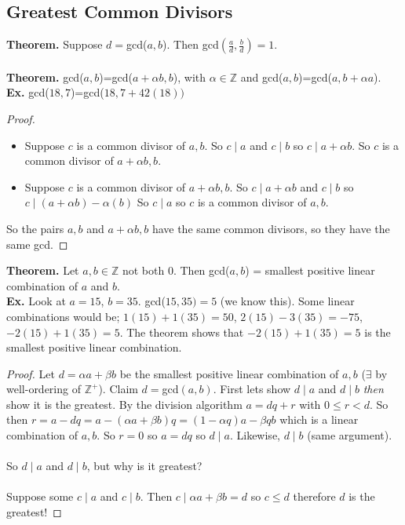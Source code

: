 \documentclass[class=article, crop=false]{standalone}
\def\integers{{\mathbb Z}}
\begin{document}
\subsection{Greatest Common Divisors}
\textbf{Theorem.} Suppose $d=$gcd($a,b$). Then gcd$\left(\frac{a}{d}, \frac{b}{d}\right)=1$.\\\\
\textbf{Theorem.} gcd($a,b$)=gcd($a+\alpha b,b$), with $\alpha\in\integers$ and gcd($a,b$)=gcd($a, b+\alpha a$).\\
\textbf{Ex.} gcd($18,7$)=gcd($18, 7+42(18))$
\begin{proof}
	$ $
	\begin{itemize}
		\item Suppose $c$ is a common divisor of $a,b$. So $c\mid a$ and $c\mid b$ so $c\mid a+\alpha b$.
		So $c$ is a common divisor of $a+\alpha b, b$.
		\item Suppose $c$ is a common divisor of $a+\alpha b, b$. So $c\mid a+\alpha b$ and $c\mid b$ so $c\mid (a+\alpha b)- \alpha(b)$
		So $c\mid a$ so $c$ is a common divisor of $a,b$. 
	\end{itemize}
	So the pairs $a,b$ and $a+\alpha b, b$ have the same common divisors,
	so they have the same gcd.
\end{proof}
\noindent\textbf{Theorem.} Let $a,b\in\integers$ not both $0$. Then gcd($a,b$) = smallest positive linear combination
of $a$ and $b$.\\
\textbf{Ex.} Look at $a=15$, $b=35$. gcd($15,35)=5$ (we know this). Some linear combinations would be; $1(15)+1(35)=50$,
$2(15)-3(35)=-75$, $-2(15)+1(35)=5$. The theorem shows that $-2(15)+1(35)=5$ is the smallest positive linear combination.
\begin{proof}
	Let $d=\alpha a+\beta b$ be the smallest positive linear combination of $a,b$ ($\exists$ by well-ordering of $\integers^+$).
	Claim $d=$gcd$(a,b)$.
	First lets show $d\mid a$ and $d\mid b$ \emph{then} show it is the greatest.
	By the division algorithm $a=dq+r$ with $0\leq r<d$. So then $r=a-dq=a-(\alpha a+\beta b)q=(1-\alpha q)a-\beta qb$
	which is a linear combination of $a,b$. So $r=0$ so $a=dq$ so $d\mid a$. Likewise, $d\mid b$ (same argument).\\\\
	So $d\mid a$ and $d\mid b$, but why is it greatest?\\\\
	Suppose some $c\mid a$ and $c\mid b$. Then $c\mid \alpha a + \beta b=d$ so $c\leq d$ therefore $d$ is the greatest!
\end{proof}
\end{document}

